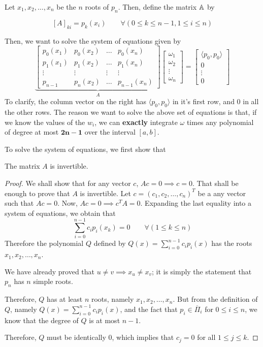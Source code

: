 Let $x_1, x_2, \dots , x_n$ be the $n$ roots of $p_n$. Then, define the matrix $\mathbb{A}$ by
\begin{defn}
  \[
    [A]_{ki} = p_k(x_i) \qquad \forall(0 \leq k \leq n-1, 1 \leq i \leq n)
  \]
\end{defn}
Then, we want to solve the system of equations given by
\begin{equation}
  \label{apr18:conds:w_i}
  \underbrace
  {\begin{bmatrix}
    p_0(x_1) & p_0(x_2) & \dots & p_0(x_n) \\[5pt]
    p_1(x_1) & p_1(x_2) & \dots & p_1(x_n) \\[5pt]
    \vdots & \vdots & \vdots & \vdots \\[5pt]
    p_{n-1} & p_n(x_2) & \dots & p_{n-1}(x_n)
  \end{bmatrix}}_A
  \begin{bmatrix} \omega_1 \\[5pt] \omega_2 \\[5pt] \vdots \\[5pt] \omega_n \end{bmatrix}
  =
  \begin{bmatrix} \langle p_0, p_0 \rangle \\[5pt] 0 \\[5pt] \vdots \\[5pt] 0 \end{bmatrix}
\end{equation}
To clarify, the column vector on the right has $\langle p_0, p_0 \rangle$ in it's first row, and 0 in all the other rows. The reason we want to solve the above set of equations is that, if we know the values of the $w_i$, we can \textbf{exactly} integrate $\omega$ times any polynomial of degree at most $\bm{2n-1}$ over the interval $[a, b]$.

To solve the system of equations, we first show that
\begin{thm}
  The matrix $A$ is invertible.
\end{thm}
\begin{proof}
   We shall show that for any vector $c$, $Ac = 0 \implies c = 0$. That shall be enough to prove that $A$ is invertible. Let $c = (c_1, c_2, \dots , c_n)^T$ be a any vector such that $Ac = 0$. Now, $Ac = 0 \implies c^TA = 0$. Expanding the last equality into a system of equations, we obtain that
  \[
    \sum_{i=0}^{n-1} c_i p_i(x_k) = 0 \qquad \forall(1 \leq k \leq n)
  \]
  Therefore the polynomial $Q$ defined by $Q(x) = \sum_{i=0}^{n-1} c_i p_i(x)$ has the roots $x_1, x_2, \dots , x_n$.
  
  We have already proved that $u \neq v \implies x_u \neq x_v$; it is simply the statement that $p_n$ has $n$ simple roots.

  Therefore, $Q$ has at least $n$ roots, namely $x_1, x_2, \dots , x_n$. But from the definition of $Q$, namely $Q(x) = \sum_{i=0}^{n-1} c_i p_i(x)$, and the fact that $p_i \in \overline{\Pi}_i$ for $0 \leq i \leq n$, we know that the degree of $Q$ is at most $n-1$.

  Therefore, $Q$ must be identically 0, which implies that $c_j = 0$ for all $1 \leq j \leq k$.
  \hfill
\end{proof}

